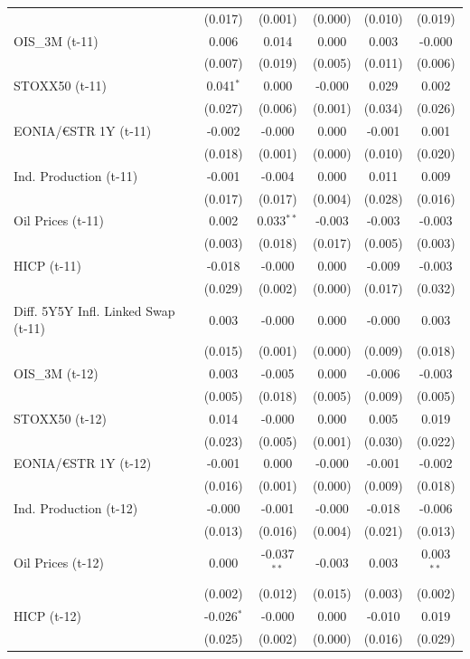\begin{longtable}[t]{lccccc}
 & (0.017) & (0.001) & (0.000) & (0.010) & (0.019)\\
OIS\_3M (t-11) & 0.006 & 0.014 & 0.000 & 0.003 & -0.000\\
 & (0.007) & (0.019) & (0.005) & (0.011) & (0.006)\\
STOXX50 (t-11) & 0.041$^{*}$ & 0.000 & -0.000 & 0.029 & 0.002\\
 & (0.027) & (0.006) & (0.001) & (0.034) & (0.026)\\
EONIA/€STR 1Y (t-11) & -0.002 & -0.000 & 0.000 & -0.001 & 0.001\\
 & (0.018) & (0.001) & (0.000) & (0.010) & (0.020)\\
Ind. Production (t-11) & -0.001 & -0.004 & 0.000 & 0.011 & 0.009\\
 & (0.017) & (0.017) & (0.004) & (0.028) & (0.016)\\
Oil Prices (t-11) & 0.002 & 0.033$^{**}$ & -0.003 & -0.003 & -0.003\\
 & (0.003) & (0.018) & (0.017) & (0.005) & (0.003)\\
HICP (t-11) & -0.018 & -0.000 & 0.000 & -0.009 & -0.003\\
 & (0.029) & (0.002) & (0.000) & (0.017) & (0.032)\\
Diff. 5Y5Y Infl. Linked Swap (t-11) & 0.003 & -0.000 & 0.000 & -0.000 & 0.003\\
 & (0.015) & (0.001) & (0.000) & (0.009) & (0.018)\\
OIS\_3M (t-12) & 0.003 & -0.005 & 0.000 & -0.006 & -0.003\\
 & (0.005) & (0.018) & (0.005) & (0.009) & (0.005)\\
STOXX50 (t-12) & 0.014 & -0.000 & 0.000 & 0.005 & 0.019\\
 & (0.023) & (0.005) & (0.001) & (0.030) & (0.022)\\
EONIA/€STR 1Y (t-12) & -0.001 & 0.000 & -0.000 & -0.001 & -0.002\\
 & (0.016) & (0.001) & (0.000) & (0.009) & (0.018)\\
Ind. Production (t-12) & -0.000 & -0.001 & -0.000 & -0.018 & -0.006\\
 & (0.013) & (0.016) & (0.004) & (0.021) & (0.013)\\
Oil Prices (t-12) & 0.000 & -0.037$^{**}$ & -0.003 & 0.003 & 0.003$^{**}$\\
 & (0.002) & (0.012) & (0.015) & (0.003) & (0.002)\\
HICP (t-12) & -0.026$^{*}$ & -0.000 & 0.000 & -0.010 & 0.019\\
 & (0.025) & (0.002) & (0.000) & (0.016) & (0.029)\\

\end{longtable}
